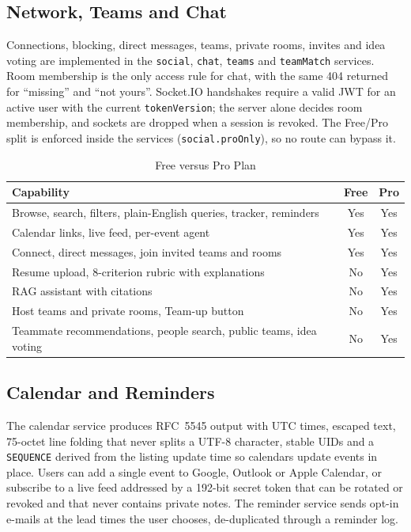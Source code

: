 \documentclass[12pt,a4paper]{report}
\begin{document}
\subsection{Network, Teams and Chat}
Connections, blocking, direct messages, teams, private rooms, invites and idea voting are implemented in the \texttt{social}, \texttt{chat}, \texttt{teams} and \texttt{teamMatch} services. Room membership is the only access rule for chat, with the same 404 returned for ``missing'' and ``not yours''. Socket.IO handshakes require a valid JWT for an active user with the current \texttt{tokenVersion}; the server alone decides room membership, and sockets are dropped when a session is revoked. The Free/Pro split is enforced inside the services (\texttt{social.proOnly}), so no route can bypass it.

\begin{table}[H]
\centering
\caption{Free versus Pro Plan}
\begin{tabularx}{\textwidth}{|X|c|c|}
\hline
\textbf{Capability} & \textbf{Free} & \textbf{Pro} \\
\hline
Browse, search, filters, plain-English queries, tracker, reminders & Yes & Yes \\
\hline
Calendar links, live feed, per-event agent & Yes & Yes \\
\hline
Connect, direct messages, join invited teams and rooms & Yes & Yes \\
\hline
Resume upload, 8-criterion rubric with explanations & No & Yes \\
\hline
RAG assistant with citations & No & Yes \\
\hline
Host teams and private rooms, Team-up button & No & Yes \\
\hline
Teammate recommendations, people search, public teams, idea voting & No & Yes \\
\hline
\end{tabularx}
\end{table}

\subsection{Calendar and Reminders}
The calendar service produces RFC~5545 output with UTC times, escaped text, 75-octet line folding that never splits a UTF-8 character, stable UIDs and a \texttt{SEQUENCE} derived from the listing update time so calendars update events in place. Users can add a single event to Google, Outlook or Apple Calendar, or subscribe to a live feed addressed by a 192-bit secret token that can be rotated or revoked and that never contains private notes. The reminder service sends opt-in e-mails at the lead times the user chooses, de-duplicated through a reminder log.
\end{document}
